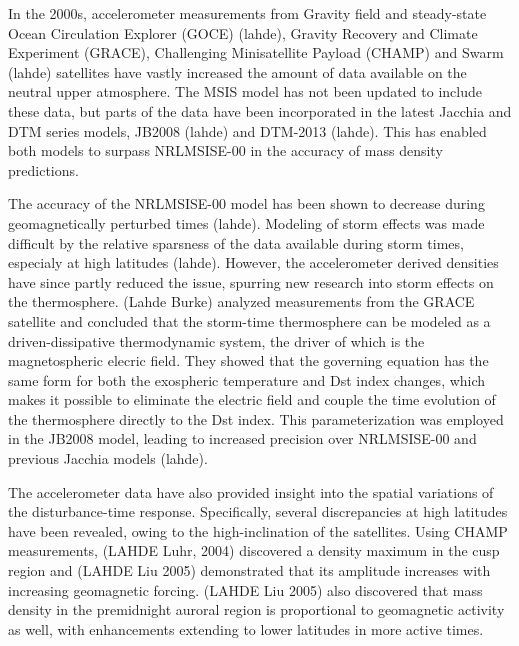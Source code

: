 \documentclass[referee,a4paper,12pt,traditabstract]{swsc}
\begin{document}
\begin{linenumbers}
In the 2000s, accelerometer measurements from Gravity field and steady-state Ocean Circulation Explorer (GOCE) (lahde), Gravity Recovery and Climate Experiment (GRACE), Challenging Minisatellite Payload (CHAMP) and Swarm (lahde) satellites have vastly increased the amount of data available on the neutral upper atmosphere. The MSIS model has not been updated to include these data, but parts of the data have been incorporated in the latest Jacchia and DTM series models, JB2008 (lahde) and DTM-2013 (lahde). This has enabled both models to surpass NRLMSISE-00 in the accuracy of mass density predictions. 

The accuracy of the NRLMSISE-00 model has been shown to decrease during geomagnetically perturbed times (lahde). Modeling of storm effects was made difficult by the relative sparsness of the data available during storm times, especialy at high latitudes (lahde). However, the accelerometer derived densities have since partly reduced the issue, spurring new research into storm effects on the thermosphere. (Lahde Burke) analyzed measurements from the GRACE satellite and concluded that the storm-time thermosphere can be modeled as a driven-dissipative thermodynamic system, the driver of which is the magnetospheric elecric field. They showed that the governing equation has the same form for both the exospheric temperature and Dst index changes, which makes it possible to eliminate the electric field and couple the time evolution of the thermosphere directly to the Dst index. This parameterization was employed in the JB2008 model, leading to increased precision over NRLMSISE-00 and previous Jacchia models (lahde). 

The accelerometer data have also provided insight into the spatial variations of the disturbance-time response. Specifically, several discrepancies at high latitudes have been revealed, owing to the high-inclination of the satellites. Using CHAMP measurements, (LAHDE Luhr, 2004) discovered a density maximum in the cusp region and (LAHDE Liu 2005) demonstrated that its amplitude increases with increasing geomagnetic forcing. (LAHDE Liu 2005) also discovered that mass density in the premidnight auroral region is proportional to geomagnetic activity as well, with enhancements extending to lower latitudes in more active times. 


\end{linenumbers}
\end{document}
